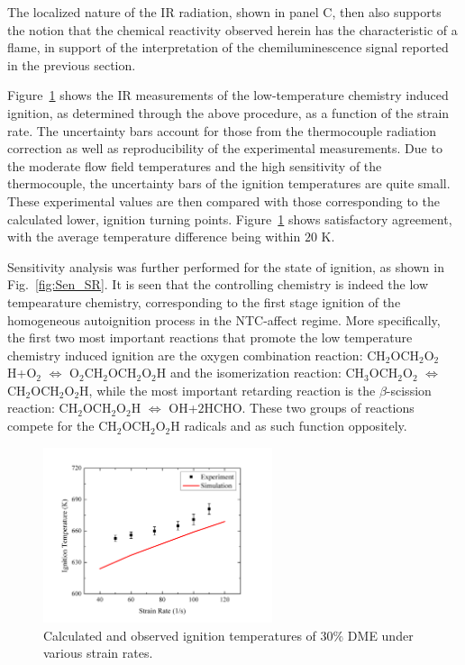 \documentclass[review,3p,times]{elsarticleUS}
\begin{document}
The localized nature of the IR radiation, shown in panel C, then also supports the notion that the chemical reactivity observed herein has the characteristic of a flame, in support of the interpretation of the chemiluminescence signal reported in the previous section.

Figure~\ref{fig:Ign-SR} shows the IR measurements of the low-temperature chemistry induced ignition, as determined through the above procedure, as a function of the strain rate.  The uncertainty bars account for those from the thermocouple radiation correction as well as reproducibility of the experimental measurements.  Due to the moderate flow field temperatures and the high sensitivity of the thermocouple, the uncertainty bars of the ignition temperatures are quite small.  These experimental values are then compared with those corresponding to the calculated lower, ignition turning points.  Figure~\ref{fig:Ign-SR} shows satisfactory agreement, with the average temperature difference being within $20$ K.

Sensitivity analysis was further performed for the state of ignition, as shown in Fig.~\ref{fig:Sen_SR}.  It is seen that the controlling chemistry is indeed the low tempearature chemistry, corresponding to the first stage ignition of the homogeneous autoignition process in the NTC-affect regime.  More specifically, the first two most important reactions that promote the low temperature chemistry induced ignition are the oxygen combination reaction: CH$_2$OCH$_2$O$_2$H+O$_2$ $\Leftrightarrow$ O$_2$CH$_2$OCH$_2$O$_2$H and the isomerization reaction: CH$_3$OCH$_2$O$_2$ $\Leftrightarrow$ CH$_2$OCH$_2$O$_2$H, while the most important retarding reaction is the $\beta$-scission reaction: CH$_2$OCH$_2$O$_2$H $\Leftrightarrow$ OH+$2$HCHO.  These two groups of reactions compete for the CH$_2$OCH$_2$O$_2$H radicals and as such function oppositely.

\begin{figure}[t]
  \centering
  \scriptsize
  \vspace{-0.1in}
  \includegraphics[width=0.6\textwidth]{Ign-SR.png}
  \normalsize
  \vspace{-0.1in}
  \caption{Calculated and observed ignition temperatures of $30\%$ DME under various strain rates.}
  \label{fig:Ign-SR}
\end{figure} 
\end{document}
